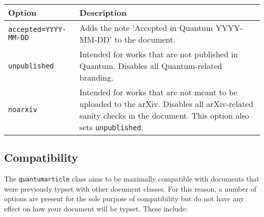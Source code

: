\documentclass[a4paper,noarxiv,onecolumn]{quantumarticle}
\newenvironment{options}
	{\medskip\noindent\begin{longtable}{p{.25\columnwidth}p{.694\columnwidth}}
	\textsf{Option} & \textsf{Description} \\
	\midrule
	}
	{\bottomrule\end{longtable}}
\newcommand{\option}[2]{
	\small\texttt{#1} & {\small#2} \\
}
\begin{document}
	\begin{options}
		\option{accepted=YYYY-MM-DD}{%
			Adds the note 'Accepted in Quantum YYYY-MM-DD' to the document.
		}
		\option{unpublished}{%
			Intended for works that are not published in Quantum. Disables all Quantum-related branding.
		}
		\option{noarxiv}{%
			Intended for works that are not meant to be uploaded to the arXiv. Disables all arXiv-related sanity checks in the document. This option also sets \texttt{unpublished}.
		}
	\end{options}

	\subsection{Compatibility}
	The \texttt{quantumarticle} class aims to be maximally compatible with documents that were previously typset with other document classes. For this reason, a number of options are present for the sole purpose of compatibility but do not have any effect on how your document will be typset. These include:
	
\end{document}
